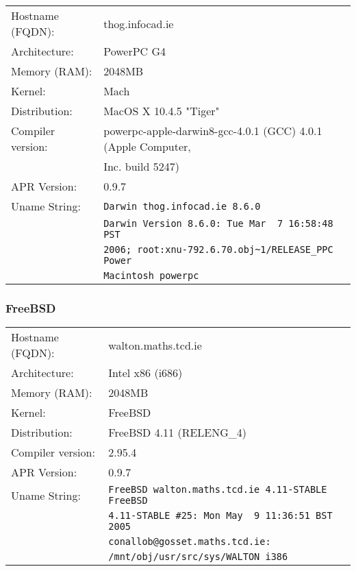 \begin{tabular}{ll}
Hostname (FQDN):	&	thog.infocad.ie	 				\\
Architecture:		&	PowerPC G4							\\
Memory (RAM):		&	2048MB								\\
Kernel:				&	Mach									\\
Distribution:		&	MacOS X 10.4.5 "Tiger"			\\
Compiler version:	&	powerpc-apple-darwin8-gcc-4.0.1 (GCC) 4.0.1 (Apple Computer,\\ 
						&	Inc. build 5247)\\
APR Version:		&	0.9.7									\\
Uname String:		& \verb!Darwin thog.infocad.ie 8.6.0!\\
						& \verb!Darwin Version 8.6.0: Tue Mar  7 16:58:48 PST!\\ 
						& \verb!2006; root:xnu-792.6.70.obj~1/RELEASE_PPC Power! \\ 
						& \verb!Macintosh powerpc!	\\
\end{tabular}

\subsubsection{FreeBSD}

\begin{tabular}{ll}
Hostname (FQDN):	&	walton.maths.tcd.ie 				\\
Architecture:		&	Intel x86 (i686)					\\
Memory (RAM):		&	2048MB								\\
Kernel:				&	FreeBSD								\\
Distribution:		&	FreeBSD 4.11 (RELENG\_4)		\\
Compiler version:	&	2.95.4								\\
APR Version:		&	0.9.7									\\
Uname String:		& \verb!FreeBSD walton.maths.tcd.ie 4.11-STABLE FreeBSD! \\
						& \verb!4.11-STABLE #25: Mon May  9 11:36:51 BST 2005! \\ 
						& \verb!conallob@gosset.maths.tcd.ie:! \\ 
						& \verb!/mnt/obj/usr/src/sys/WALTON i386! \\
\end{tabular}

